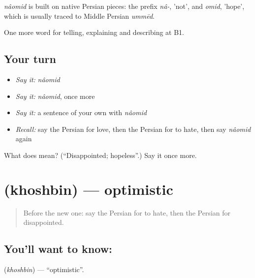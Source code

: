 \begin{cousinweb}
\emph{nâomid} is built on native Persian pieces: the prefix \emph{nâ-}, 'not', and \emph{omid}, 'hope', which is usually traced to Middle Persian \emph{ummēd}.
\end{cousinweb}

\begin{grammarlens}[title={What you've built}]
One more word for telling, explaining and describing at B1.
\end{grammarlens}

\subsection*{Your turn}
\begin{itemize}
\raggedright
  \item \emph{Say it:} \emph{nâomid}
  \item \emph{Say it:} \emph{nâomid}, once more
  \item \emph{Say it:} a sentence of your own with \emph{nâomid}
  \item \emph{Recall:} say the Persian for love, then the Persian for to hate, then say \emph{nâomid} again
\end{itemize}

\begin{tcolorbox}[breakable,colback=teal!4,colframe=teal!35!black,title={Before you move on}]
What does  mean? (\textquotedblleft{}Disappointed; hopeless\textquotedblright{}.) Say it once more.
\end{tcolorbox}
\section[\texorpdfstring{\fa{خوشبین} (khoshbin)}{خوشبین (khoshbin)}]{ (khoshbin) — optimistic}

\label{lesson:FA-C487-khoshbin}



\begin{quote}
Before the new one: say the Persian for to hate, then the Persian for disappointed.
\end{quote}

\subsection*{You'll want to know: }
\textbf{} (\emph{khoshbin}) — \textquotedblleft{}optimistic\textquotedblright{}.

